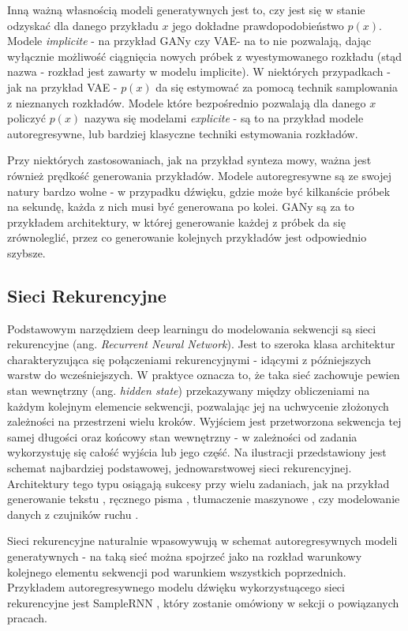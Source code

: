 \documentclass[magisterska]{pracamgr}
\begin{document}
Inną ważną własnością modeli generatywnych jest to, czy jest się w stanie odzyskać dla danego przykładu $x$ jego dokładne prawdopodobieństwo $p(x)$. Modele \emph{implicite} - na przykład GANy czy VAE- na to nie pozwalają, dając wyłącznie możliwość ciągnięcia nowych próbek z wyestymowanego rozkładu (stąd nazwa - rozkład jest zawarty w modelu implicite). W niektórych przypadkach - jak na przykład VAE - $p(x)$ da się estymować za pomocą technik samplowania z nieznanych rozkładów. Modele które bezpośrednio pozwalają dla danego $x$ policzyć $p(x)$ nazywa się modelami \emph{explicite} - są to na przykład modele autoregresywne, lub bardziej klasyczne techniki estymowania rozkładów.

Przy niektórych zastosowaniach, jak na przykład synteza mowy, ważna jest również prędkość generowania przykładów. Modele autoregresywne są ze swojej natury bardzo wolne - w przypadku dźwięku, gdzie może być kilkanście próbek na sekundę, każda z nich musi być generowana po kolei. GANy są za to przykładem architektury, w której generowanie każdej z próbek da się zrównoleglić, przez co generowanie kolejnych przykładów jest odpowiednio szybsze.

\subsection{Sieci Rekurencyjne}

Podstawowym narzędziem deep learningu do modelowania sekwencji są sieci rekurencyjne (ang. \textit{Recurrent Neural Network}). Jest to szeroka klasa architektur charakteryzująca się połączeniami rekurencyjnymi - idącymi z późniejszych warstw do wcześniejszych. W praktyce oznacza to, że taka sieć zachowuje pewien stan wewnętrzny (ang. \textit{hidden state}) przekazywany między obliczeniami na każdym kolejnym elemencie sekwencji, pozwalając jej na uchwycenie złożonych zależności na przestrzeni wielu kroków. Wyjściem jest przetworzona sekwencja tej samej długości oraz końcowy stan wewnętrzny - w zależności od zadania wykorzystuję się całość wyjścia lub jego część. Na ilustracji przedstawiony jest schemat najbardziej podstawowej, jednowarstwowej sieci rekurencyjnej. Architektury tego typu osiągają sukcesy przy wielu zadaniach, jak na przykład generowanie tekstu \cite{hinton2011textrnn} \cite{graves2014textrnns}, ręcznego pisma \cite{graves2014textrnns}, tłumaczenie maszynowe \cite{kalchbrenner-blunsom-2013-recurrent}, czy modelowanie danych z czujników ruchu \cite{Sutskever2008trbm}.

Sieci rekurencyjne naturalnie wpasowywują w schemat autoregresywnych modeli generatywnych - na taką sieć można spojrzeć jako na rozkład warunkowy kolejnego elementu sekwencji pod warunkiem wszystkich poprzednich. Przykładem autoregresywnego modelu dźwięku wykorzystuącego sieci rekurencyjne jest SampleRNN \cite{mehri2017samplernn}, który zostanie omówiony w sekcji o powiązanych pracach.
\end{document}
